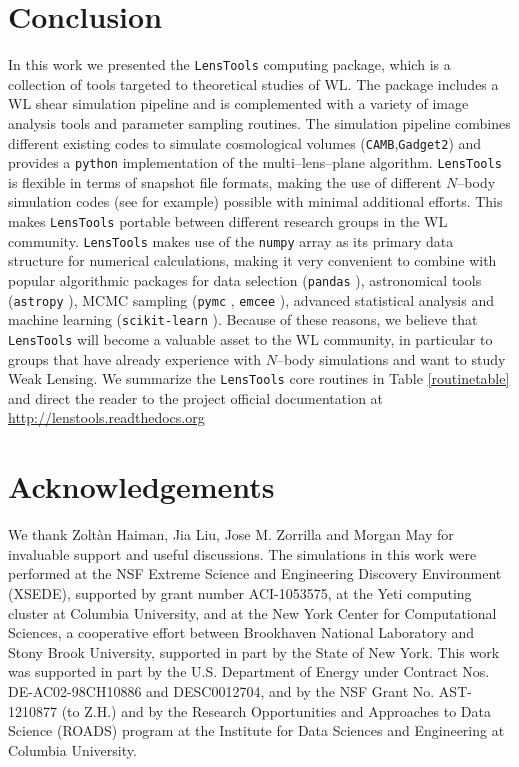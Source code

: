 \documentclass[5p]{elsarticle}
\newcommand{\ttt}[1]{\texttt{#1}}
\newcommand{\LT}{\texttt{LensTools} }
\begin{document}
\section{Conclusion}
%
In this work we presented the \LT computing package, which is a collection of tools targeted to theoretical studies of WL. The package includes a WL shear simulation pipeline and is complemented with a variety of image analysis tools and parameter sampling routines. The simulation pipeline combines different existing codes to simulate cosmological volumes (\ttt{CAMB},\ttt{Gadget2}) and provides a \ttt{python} implementation of the multi--lens--plane algorithm. \LT is flexible in terms of snapshot file formats, making the use of different $N$--body simulation codes (see \citep{HACC} for example) possible with minimal additional efforts. This makes \LT portable between different research groups in the WL community. \LT makes use of the \ttt{numpy} array as its primary data structure for numerical calculations, making it very convenient to combine with popular algorithmic packages for data selection (\ttt{pandas} \citep{pandas}), astronomical tools (\ttt{astropy} \citep{astropy}), MCMC sampling (\ttt{pymc} \citep{pymc}, \ttt{emcee} \citep{emcee}), advanced statistical analysis and machine learning (\ttt{scikit-learn} \citep{scikit-learn}). Because of these reasons, we believe that \LT will become a valuable asset to the WL community, in particular to groups that have already experience with $N$--body simulations and want to study Weak Lensing. We summarize the \LT core routines in Table \ref{routinetable} and direct the reader to the project official documentation at \url{http://lenstools.readthedocs.org}    


 

\section*{Acknowledgements}
We thank Zolt\`an Haiman, Jia Liu, Jose M. Zorrilla and Morgan May for invaluable support and useful discussions. The simulations in this work were performed at the NSF Extreme Science and Engineering Discovery Environment (XSEDE), supported by grant number ACI-1053575, at the Yeti computing cluster at Columbia University, and at the New York Center for Computational Sciences, a cooperative effort between Brookhaven National Laboratory and Stony Brook University, supported in part by the State of New York. This work was supported in part by the U.S. Department of Energy under Contract Nos. DE-AC02-98CH10886 and DESC0012704, and by the NSF Grant No. AST-1210877 (to Z.H.) and by the Research Opportunities and Approaches to Data Science (ROADS) program at the Institute for Data Sciences and Engineering at Columbia University. 
\end{document}
